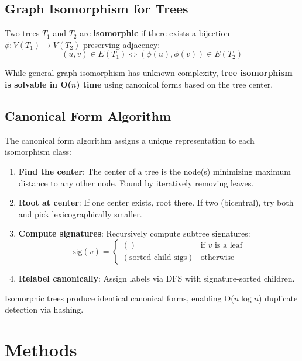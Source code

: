 \documentclass[conference]{IEEEtran}
\begin{document}
\subsection{Graph Isomorphism for Trees}

Two trees $T_1$ and $T_2$ are \textbf{isomorphic} if there exists a bijection $\phi: V(T_1) \to V(T_2)$ preserving adjacency:
\begin{equation}
(u, v) \in E(T_1) \Leftrightarrow (\phi(u), \phi(v)) \in E(T_2)
\end{equation}

While general graph isomorphism has unknown complexity, \textbf{tree isomorphism is solvable in O($n$) time} using canonical forms based on the tree center.

\subsection{Canonical Form Algorithm}

The canonical form algorithm assigns a unique representation to each isomorphism class:

\begin{enumerate}
    \item \textbf{Find the center}: The center of a tree is the node(s) minimizing maximum distance to any other node. Found by iteratively removing leaves.
    
    \item \textbf{Root at center}: If one center exists, root there. If two (bicentral), try both and pick lexicographically smaller.
    
    \item \textbf{Compute signatures}: Recursively compute subtree signatures:
    \begin{equation}
    \text{sig}(v) = \begin{cases}
    () & \text{if } v \text{ is a leaf} \\
    (\text{sorted child sigs}) & \text{otherwise}
    \end{cases}
    \end{equation}
    
    \item \textbf{Relabel canonically}: Assign labels via DFS with signature-sorted children.
\end{enumerate}

Isomorphic trees produce identical canonical forms, enabling O($n \log n$) duplicate detection via hashing.

\section{Methods}
\end{document}
